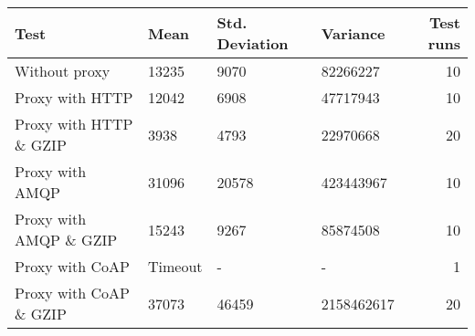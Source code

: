 \begin{tabular}{llllr}
\hline
 Test                   & Mean    & Std. Deviation   & Variance   &   Test runs \\
\hline
 Without proxy          & 13235   & 9070             & 82266227   &          10 \\
 Proxy with HTTP        & 12042   & 6908             & 47717943   &          10 \\
 Proxy with HTTP \& GZIP & 3938    & 4793             & 22970668   &          20 \\
 Proxy with AMQP        & 31096   & 20578            & 423443967  &          10 \\
 Proxy with AMQP \& GZIP & 15243   & 9267             & 85874508   &          10 \\
 Proxy with CoAP        & Timeout & -                & -          &           1 \\
 Proxy with CoAP \& GZIP & 37073   & 46459            & 2158462617 &          20 \\
\hline
\end{tabular}
